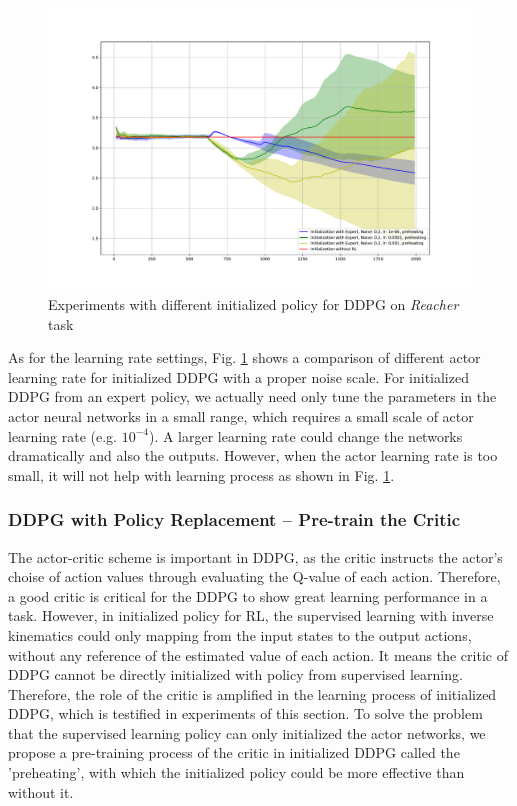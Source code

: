 \documentclass{article}
\begin{document}
\begin{figure}[htbp]
	\centering
	\includegraphics[scale=0.4]{img/ddpg_compare5.pdf}
	\caption{Experiments with different initialized policy for DDPG on \textit{Reacher} task}
	\label{fig:noise5}
\end{figure}

As for the learning rate settings, Fig. \ref{fig:noise5} shows a comparison of different actor learning rate for initialized DDPG with a proper noise scale. For initialized DDPG from an expert policy, we actually need only tune the parameters in the actor neural networks in a small range, which requires a small scale of actor learning rate (e.g. $10^{-4}$). A larger learning rate could change the networks dramatically and also the outputs. However, when the actor learning rate is too small, it will not help with learning process as shown in Fig. \ref{fig:noise5}.


\subsubsection{DDPG with Policy Replacement -- Pre-train the Critic}\label{pretrain}
The actor-critic scheme is important in DDPG, as the critic instructs the actor's choise of action values through evaluating the Q-value of each action. Therefore, a good critic is critical for the DDPG to show great learning performance in a task. However, in initialized policy for RL, the supervised learning with inverse kinematics could only mapping from the input states to the output actions, without any reference of the estimated value of each action. It means the critic of DDPG cannot be directly initialized with policy from supervised learning. Therefore, the role of the critic is amplified in the learning process of initialized DDPG, which is testified in experiments of this section. To solve the problem that the supervised learning policy can only initialized the actor networks, we propose a pre-training process of the critic in initialized DDPG called the 'preheating', with which the initialized policy could be more effective than without it.
\end{document}
